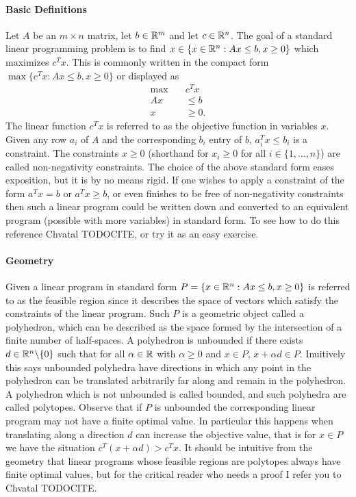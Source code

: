 \paragraph{Basic Definitions}
Let $A$ be an $m \times n$ matrix, let $b \in \mathbb{R}^m$ and let $c \in \mathbb{R}^n$. The goal of a standard linear programming problem is to find $x \in \{x \in \mathbb{R}^n : Ax \leq b, x \geq 0 \}$ which maximizes $c^Tx$. This is commonly written in the compact form $\max\{c^Tx : Ax \leq b, x \geq 0 \}$ or displayed as
\begin{align*}
\max\quad &c^Tx \\
Ax &\leq b \\
x &\geq 0.
\end{align*}
The linear function $c^Tx$ is referred to as the objective function in variables $x$. Given any row $a_i$ of $A$ and the corresponding $b_i$ entry of $b$, $a_i^Tx \leq b_i$ is a constraint. The constraints $x \geq 0$ (shorthand for $x_i \geq 0$ for all $i \in \{1, \dots, n\}$) are called non-negativity constraints. The choice of the above standard form eases exposition, but it is by no means rigid. If one wishes to apply a constraint of the form $a^T x = b$ or $a^T x \geq b$, or even finishes to be free of non-negativity constraints then such a linear program could be written down and converted to an equivalent program (possible with more variables) in standard form. To see how to do this reference Chvatal TODOCITE, or try it as an easy exercise.
\paragraph{Geometry} Given a linear program in standard form $P = \{ x \in \mathbb{R}^n: Ax \leq b, x \geq 0 \}$ is referred to as the feasible region since it describes the space of vectors which satisfy the constraints of the linear program. Such $P$ is a geometric object called a polyhedron, which can be described as the space formed by the intersection of a finite number of half-spaces. A polyhedron is unbounded if there exists $d \in \mathbb{R}^n\backslash \{0\}$ such that for all $\alpha \in \mathbb{R}$ with $\alpha \geq 0$ and $x \in P$, $x + \alpha d \in P$. Inuitively this says unbounded polyhedra have directions in which any point in the polyhedron can be translated arbitrarily far along and remain in the polyhedron. A polyhedron which is not unbounded is called bounded, and such polyhedra are called polytopes. Observe that if $P$ is unbounded the corresponding linear program may not have a finite optimal value. In particular this happens when translating along a direction $d$ can increase the objective value, that is for $x \in P$ we have the situation $c^T(x + \alpha d) > c^Tx$. It should be intuitive from the geometry that linear programs whose feasible regions are polytopes always have finite optimal values, but for the critical reader who needs a proof I refer you to Chvatal TODOCITE.

